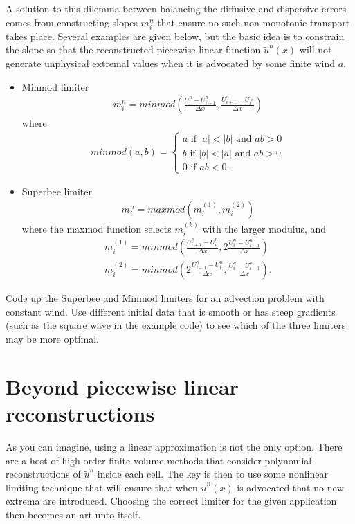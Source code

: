 A solution to this dilemma between balancing the diffusive and dispersive errors comes from constructing slopes $m_i^n$ that ensure no such non-monotonic transport takes place.  Several examples are given below, but the basic idea is to constrain the slope so that the reconstructed piecewise linear function $\tilde{u}^n(x)$ will not generate unphysical extremal values when it is advocated by some finite wind $a$.

\begin{itemize}
\item Minmod limiter
\begin{gather}
m_i^n = minmod\left(\frac{U_i^n-U_{i-1}^n}{\Delta x},\frac{U_{i+1}^n-U_{i^n}}{\Delta x}\right)
\end{gather}
where
\begin{gather}
minmod(a,b) = \left\{\begin{array}{ccc}a  \mbox{ if } |a| < |b|  \mbox{ and } ab>0\\
b  \mbox{ if } |b|<|a|  \mbox{ and } ab>0\\ 0  \mbox{ if } ab < 0 .\end{array}\right.
\end{gather}
\item Superbee limiter
\begin{gather}
m_i^n = maxmod(m^{(1)}_i,m^{(2)}_i)
\end{gather}
where the maxmod function selects $m^{(k)}_i$ with the larger modulus, and
\begin{gather}
m^{(1)}_i = minmod \left(\frac{U_{i+1}^n-U_i^n}{\Delta x},2\frac{U_i^n-U_{i-1}^n}{\Delta x}\right)\\
m^{(2)}_i = minmod \left( 2\frac{U_{i+1}^n-U_i^n}{\Delta x},\frac{U_i^n-U_{i-1}^n}{\Delta x}\right).
\end{gather}
\end{itemize}

\begin{problem}
Code up the Superbee and Minmod %
 limiters for an advection problem with constant wind.  Use different initial data that is smooth or has steep gradients (such as the square wave in the example code) to see which of the three limiters may be more optimal.
\end{problem}

\section*{Beyond piecewise linear reconstructions}
As you can imagine, using a linear approximation is not the only option.  There are a host of high order finite volume methods that consider polynomial reconstructions of $\tilde{u}^n$ inside each cell.  The key is then to use some nonlinear limiting technique that will ensure that when $\tilde{u}^n(x)$ is advocated that no new extrema are introduced.  Choosing the correct limiter for the given application then becomes an art unto itself.